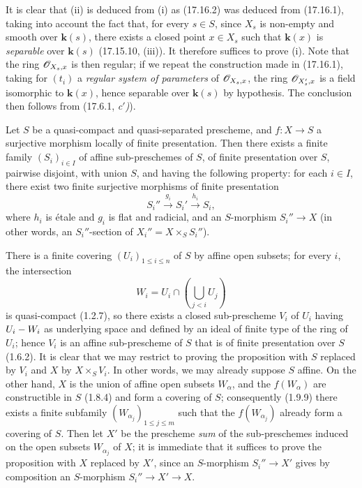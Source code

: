 It is clear that (ii) is deduced from (i) as (17.16.2) was deduced from (17.16.1), taking into account the fact that, for every $s\in S$, since $X_s$ is non-empty and smooth over $\boldsymbol{k}(s)$, there exists a closed point $x\in X_s$ such that $\boldsymbol{k}(x)$ is \emph{separable} over $\boldsymbol{k}(s)$ (17.15.10, (iii)). It therefore suffices to prove (i). Note that the ring $\mathscr{O}_{X_s,x}$ is then regular; if we repeat the construction made in (17.16.1), taking for $(t_i)$ a \emph{regular system of parameters} of $\mathscr{O}_{X_s,x}$, the ring $\mathscr{O}_{X'_s,x}$ is a field isomorphic to $\boldsymbol{k}(x)$, hence separable over $\boldsymbol{k}(s)$ by hypothesis. The conclusion then follows from (17.6.1, \emph{c$'$)}).

\begin{proposition}[17.16.4]
\label{IV.17.16.4}
Let $S$ be a quasi-compact and quasi-separated prescheme, and $f:X\to S$ a surjective morphism locally of finite presentation. Then there exists a finite family $(S_i)_{i\in I}$
of affine sub-preschemes of $S$, of finite presentation over $S$, pairwise disjoint, with union $S$, and having the following property: for each $i\in I$, there exist two finite surjective morphisms of finite presentation
\[
  S_i''\xrightarrow{g_i}S_i'\xrightarrow{h_i}S_i,
\]
where $h_i$ is étale and $g_i$ is flat and radicial, and an $S$-morphism $S_i''\to X$ \textup{(in other words, an} $S_i''$-section \textup{of} $X_i''=X\times_S S_i''$\textup{)}.
\end{proposition}

There is a finite covering $(U_i)_{1\leq i\leq n}$ of $S$ by affine open subsets; for every $i$, the intersection
\[
  W_i=U_i\cap\left(\bigcup_{j<i}U_j\right)
\]
is quasi-compact (1.2.7), so there exists a closed sub-prescheme $V_i$ of $U_i$ having $U_i- W_i$ as underlying space and defined by an ideal of finite type of the ring of $U_i$; hence $V_i$ is an affine sub-prescheme of $S$ that is of finite presentation over $S$ (1.6.2). It is clear that we may restrict to proving the proposition with $S$ replaced by $V_i$ and $X$ by $X\times_S V_i$. In other words, we may already suppose $S$ affine. On the other hand, $X$ is the union of affine open subsets $W_\alpha$, and the $f(W_\alpha)$ are constructible in $S$ (1.8.4) and form a covering of $S$; consequently (1.9.9) there exists a finite subfamily $(W_{\alpha_j})_{1\leq j\leq m}$ such that the $f(W_{\alpha_j})$ already form a covering of $S$. Then let $X'$ be the prescheme \emph{sum} of the sub-preschemes induced on the open subsets $W_{\alpha_j}$ of $X$; it is immediate that it suffices to prove the proposition with $X$ replaced by $X'$, since an $S$-morphism $S_i''\to X'$ gives by composition an $S$-morphism $S_i''\to X'\to X$.

